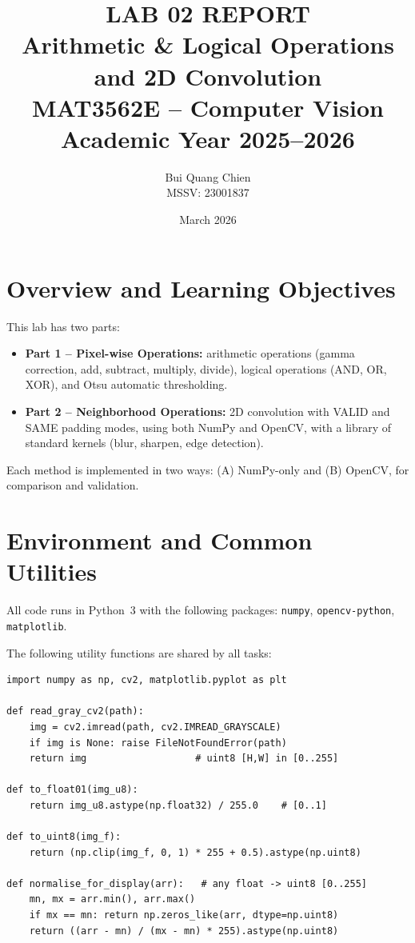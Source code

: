 \documentclass[12pt,a4paper]{article}
\title{%
  \textbf{LAB 02 REPORT}\\[0.4em]
  \large Arithmetic \& Logical Operations \\
  and 2D Convolution \\[0.8em]
  \normalsize MAT3562E -- Computer Vision\\
  Academic Year 2025--2026
}
\author{
  Bui Quang Chien\\
  MSSV: 23001837
}
\date{March 2026}
\begin{document}
\maketitle
\tableofcontents
\newpage

\section{Overview and Learning Objectives}

This lab has two parts:
\begin{itemize}[leftmargin=*]
  \item \textbf{Part 1 -- Pixel-wise Operations:}
        arithmetic operations (gamma correction, add, subtract, multiply, divide),
        logical operations (AND, OR, XOR), and Otsu automatic thresholding.
  \item \textbf{Part 2 -- Neighborhood Operations:}
        2D convolution with VALID and SAME padding modes, using both NumPy and
        OpenCV, with a library of standard kernels (blur, sharpen, edge detection).
\end{itemize}

Each method is implemented in two ways: (A) NumPy-only and (B) OpenCV, for
comparison and validation.

\section{Environment and Common Utilities}

All code runs in Python~3 with the following packages:
\texttt{numpy}, \texttt{opencv-python}, \texttt{matplotlib}.

The following utility functions are shared by all tasks:

\begin{lstlisting}
import numpy as np, cv2, matplotlib.pyplot as plt

def read_gray_cv2(path):
    img = cv2.imread(path, cv2.IMREAD_GRAYSCALE)
    if img is None: raise FileNotFoundError(path)
    return img                   # uint8 [H,W] in [0..255]

def to_float01(img_u8):
    return img_u8.astype(np.float32) / 255.0    # [0..1]

def to_uint8(img_f):
    return (np.clip(img_f, 0, 1) * 255 + 0.5).astype(np.uint8)

def normalise_for_display(arr):   # any float -> uint8 [0..255]
    mn, mx = arr.min(), arr.max()
    if mx == mn: return np.zeros_like(arr, dtype=np.uint8)
    return ((arr - mn) / (mx - mn) * 255).astype(np.uint8)
\end{lstlisting}
\end{document}
